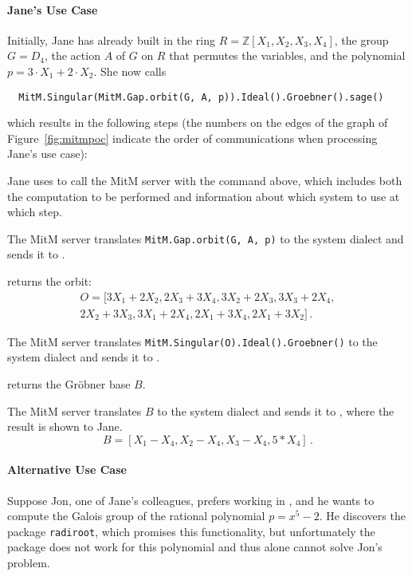 \paragraph{Jane's Use Case} 
Initially, Jane has already built in \Sage the ring $R=\mathbb{Z}[X_1,X_2,X_3,X_4]$, the group $G=D_4$, the action $A$ of $G$ on $R$ that permutes the variables, and the polynomial $p = 3\cdot X_1 + 2\cdot X_2$.  She now calls
\begin{lstlisting}
  MitM.Singular(MitM.Gap.orbit(G, A, p)).Ideal().Groebner().sage()
\end{lstlisting}
which results in the following steps (the numbers on the edges of the
graph of Figure~\ref{fig:mitmpoc} indicate the order of communications when processing Jane's use case):
\begin{compactenum}
  \item Jane uses \Sage to call the MitM server with the command above, which includes both the computation to be performed and information about which system to use at which step.
  \item The MitM server translates \lstinline|MitM.Gap.orbit(G, A, p)| to the \GAP system dialect and sends it to \GAP.
  \item \GAP returns the orbit:
    \begin{displaymath}
      \begin{split}
        O = [3X_1 + 2X_2, 2X_3 + 3X_4, 3X_2 + 2X_3, 3X_3 + 2X_4,\\
        2X_2 + 3X_3, 3X_1 + 2X_4, 2X_1 + 3X_4, 2X_1 + 3X_2]\,.
      \end{split}
    \end{displaymath}
  \item The MitM server translates \lstinline|MitM.Singular(O).Ideal().Groebner()| to the \Singular system dialect and sends it to \Singular.
  \item \Singular returns the Gröbner base $B$.
  \item The MitM server translates $B$ to the \Sage system dialect and sends it to \Sage, where the result is shown to Jane.
    \begin{displaymath}
      B = [X_1 - X_4, X_2 - X_4, X_3 - X_4, 5*X_4]\,.
    \end{displaymath}
  \end{compactenum}

\paragraph{Alternative Use Case}
Suppose Jon, one of Jane's colleagues, prefers working in \GAP, and he wants to
compute the Galois group of the rational polynomial $p = x^5 - 2$. He discovers
the \GAP package \texttt{radiroot}, which promises this functionality, but
unfortunately the package does not work for this polynomial and thus \GAP alone
cannot solve Jon's problem.

